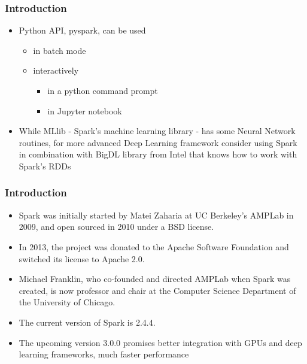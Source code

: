 \documentclass{beamer}
\begin{document}
\begin{frame}[fragile]
  \frametitle{Introduction}
  
  \begin{itemize}
  \item Python API, {\color{mycolordef}pyspark}, can be used 
    \begin{itemize} 
    \item in batch mode 
    \item interactively 
      \begin{itemize}
      \item in a python command prompt
      \item in Jupyter notebook
      \end{itemize}
    \end{itemize}
  \item While {\color{mycolordef}MLlib} - Spark's machine learning library -  has some Neural Network routines, for more advanced Deep Learning framework 
    consider using Spark in combination with {\color{mycolordef}BigDL} library from Intel that knows how to work with Spark's RDDs
  \end{itemize}  
\end{frame}



\begin{frame}[fragile]
  \frametitle{Introduction}
  
\begin{itemize}
\item Spark was initially started by Matei Zaharia at UC Berkeley's AMPLab in 2009, and open sourced in 2010 under a BSD license.
\item In 2013, the project was donated to the Apache Software Foundation and switched its license to Apache 2.0. 
\item Michael Franklin, who co-founded and directed AMPLab when Spark was created, is now professor and chair at the Computer Science Department of the University of Chicago.
\item The current version of Spark is 2.4.4. 
\item The upcoming version 3.0.0 promises better integration with GPUs and deep learning frameworks, much faster performance
\end{itemize}
\end{frame}
\end{document}
